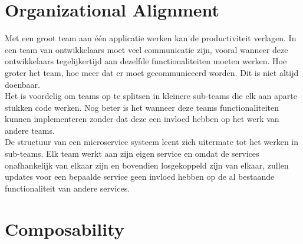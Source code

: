 \section{Organizational Alignment}
\label{sec:organizational-alignment}

Met een groot team aan één applicatie werken kan de productiviteit verlagen. In een team van ontwikkelaars moet veel communicatie zijn, vooral wanneer deze ontwikkelaars tegelijkertijd aan dezelfde functionaliteiten moeten werken. Hoe groter het team, hoe meer dat er moet gecommuniceerd worden. Dit is niet altijd doenbaar.
\\
Het is voordelig om teams op te splitsen in kleinere sub-teams die elk aan aparte stukken code werken. Nog beter is het wanneer deze teams functionaliteiten kunnen implementeren zonder dat deze een invloed hebben op het werk van andere teams.
\\
De structuur van een microservice systeem leent zich uitermate tot het werken in sub-teams. Elk team werkt aan zijn eigen service en omdat de services onafhankelijk van elkaar zijn en bovendien losgekoppeld zijn van elkaar, zullen updates voor een bepaalde service geen invloed hebben op de al bestaande functionaliteit van andere services.

\section{Composability}
\label{sec:composability}

